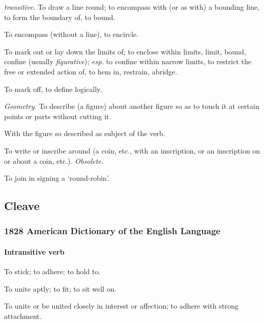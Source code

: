 			\begin{compactitem}
				\item[1.a] \textit{transitive.} To draw a line round; to encompass with (or as with) a bounding line, to form the boundary of, to bound.
				\item[1.b] To encompass (without a line), to encircle.
				\item[2.a] To mark out or lay down the limits of; to enclose within limits, limit, bound, confine (usually \textit{figurative}); \textit{esp.} to confine within narrow limits, to restrict the free or extended action of, to hem in, restrain, abridge.
				\item[2.b] To mark off, to define logically.
				\item[3.a] \textit{Geometry.} To describe (a figure) about another figure so as to touch it at certain points or parts without cutting it.
				\item[3.b] With the figure so described as subject of the verb.
				\item[4.a] To write or inscribe around (a coin, etc., with an inscription, or an inscription on or about a coin, etc.). \textit{Obsolete.}
				\item[4.b] To join in signing a `round-robin'.
			\end{compactitem}
			
	\subsection{Cleave} %
		\label{CLEAVE}
		
		\subsubsection{1828 American Dictionary of the English Language}
		
			\paragraph{Intransitive verb}
		
				\begin{compactitem}
					\item[1] To stick; to adhere; to hold to.
					\item[2] To unite aptly; to fit; to sit well on.
					\item[3] To unite or be united closely in interest or affection; to adhere with strong attachment.
				\end{compactitem}
				

